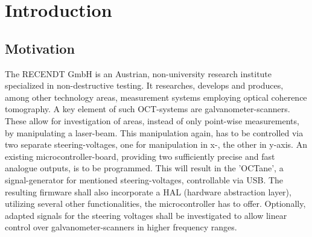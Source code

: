 \chapter{Introduction}
\label{cha:Introduction}


\section{Motivation}
The RECENDT GmbH  is an Austrian, non-university research institute specialized in non-destructive testing. It researches, develops and produces, among other technology areas, measurement systems employing optical coherence tomography. A key element of such OCT-systems are galvanometer-scanners.  These allow for investigation of areas, instead of only point-wise measurements, by manipulating a laser-beam. This manipulation again, has to be controlled via two separate steering-voltages, one for manipulation in x-, the other in y-axis. An existing microcontroller-board, providing two sufficiently precise and fast analogue outputs, is to be programmed. This will result in the 'OCTane', a signal-generator for mentioned steering-voltages, controllable via USB. The resulting firmware shall also incorporate a HAL (hardware abstraction layer), utilizing several other functionalities, the microcontroller has to offer. Optionally, adapted signals for the steering voltages shall be investigated to allow linear control over galvanometer-scanners in higher frequency ranges.

